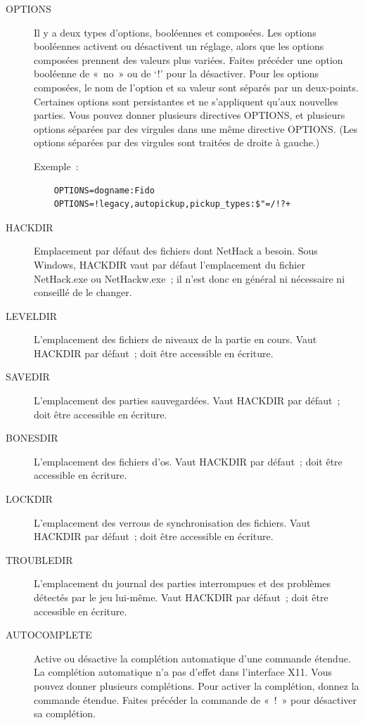 \documentclass[titlepage]{article}
\begin{document}
\begin{description}
\item[{OPTIONS}]
Il y a deux types d'options, booléennes et composées.
Les options booléennes activent ou désactivent un réglage, alors que les
options composées prennent des valeurs plus variées.
Faites précéder une option booléenne de «~no~» ou de `!' pour la
désactiver.
Pour les options composées, le nom de l'option et sa valeur sont séparés
par un deux-points.
Certaines options sont persistantes et ne s'appliquent qu'aux nouvelles
parties.
Vous pouvez donner plusieurs directives OPTIONS, et plusieurs options
séparées par des virgules dans une même directive OPTIONS.
(Les options séparées par des virgules sont traitées de droite à
gauche.)


Exemple~:
\begin{verbatim}
    OPTIONS=dogname:Fido
    OPTIONS=!legacy,autopickup,pickup_types:$"=/!?+
\end{verbatim}

\item[{HACKDIR}]
Emplacement par défaut des fichiers dont NetHack a besoin.
Sous Windows, HACKDIR vaut par défaut l'emplacement du fichier NetHack.exe
ou NetHackw.exe~; il n'est donc en général ni nécessaire ni conseillé de le
changer.

\item[{LEVELDIR}]
L'emplacement des fichiers de niveaux de la partie en cours.
Vaut HACKDIR par défaut~; doit être accessible en écriture.

\item[{SAVEDIR}]
L'emplacement des parties sauvegardées.
Vaut HACKDIR par défaut~; doit être accessible en écriture.

\item[{BONESDIR}]
L'emplacement des fichiers d'os.
Vaut HACKDIR par défaut~; doit être accessible en écriture.

\item[{LOCKDIR}]
L'emplacement des verrous de synchronisation des fichiers.
Vaut HACKDIR par défaut~; doit être accessible en écriture.

\item[{TROUBLEDIR}]
L'emplacement du journal des parties interrompues et des problèmes
détectés par le jeu lui-même.
Vaut HACKDIR par défaut~; doit être accessible en écriture.
%
%

\item[{AUTOCOMPLETE}]
Active ou désactive la complétion automatique d'une commande étendue.
La complétion automatique n'a pas d'effet dans l'interface X11.
Vous pouvez donner plusieurs complétions.
Pour activer la complétion, donnez la commande étendue.
Faites précéder la commande de «~!~» pour désactiver sa complétion.



\end{description}
\end{document}
